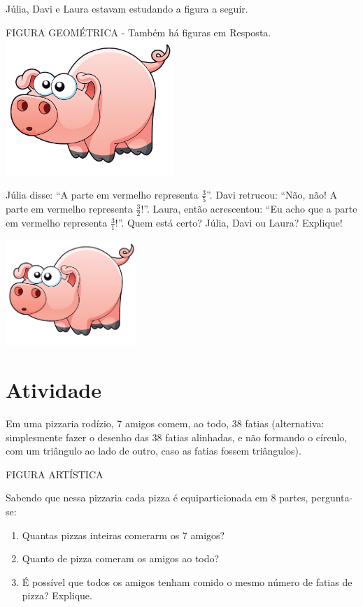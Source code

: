 \documentclass[a4,12pt]{book}
\begin{document}
Júlia, Davi e Laura estavam estudando a figura a seguir.
\begin{imagem*}[breakable]{}{}   FIGURA GEOMÉTRICA -  Também há figuras em Resposta.
    \includegraphics[width=180pt, keepaspectratio]{pig}
\end{imagem*}

Júlia disse: ``A parte em vermelho representa $\frac{3}{5}$''. Davi retrucou: ``Não, não! A parte em vermelho representa $\frac{3}{2}$!''. Laura, então acrescentou: ``Eu acho que a parte em vermelho representa $\frac{3}{1}$!''. Quem está certo? Júlia, Davi ou Laura? Explique!






\includegraphics[width=\textwidth,height=4cm, keepaspectratio]{pig}
\section{Atividade}






Em uma pizzaria rodízio, 7 amigos comem, ao todo, 38 fatias (alternativa: simplesmente fazer o desenho das 38 fatias alinhadas, e não formando o círculo, com um triângulo ao lado de outro, caso as fatias fossem triângulos).
\begin{imagem*}[breakable]{}{}   FIGURA ARTÍSTICA
\end{imagem*}

Sabendo que nessa pizzaria cada pizza é equiparticionada em 8 partes, pergunta-se:
\begin{enumerate} [\quad a)] %
  \item     Quantas pizzas inteiras comerarm os 7 amigos?
  \item     Quanto de pizza comeram os amigos ao todo?
  \item     É possível que todos os amigos tenham comido o mesmo número de fatias de pizza? Explique.
\end{enumerate} %
\end{document}
